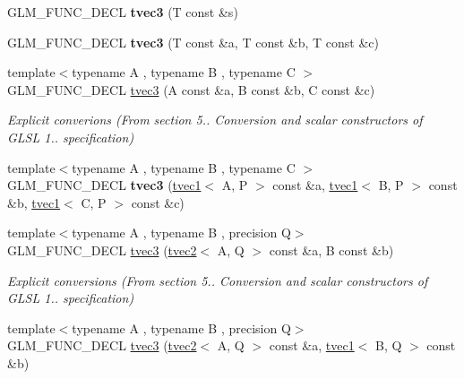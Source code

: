 \begin{DoxyCompactItemize}
\item 
\hypertarget{structglm_1_1tvec3_a60d8f066b56d8355f2ac77a8e6ed1539}{G\-L\-M\-\_\-\-F\-U\-N\-C\-\_\-\-D\-E\-C\-L {\bfseries tvec3} (T const \&s)}\label{structglm_1_1tvec3_a60d8f066b56d8355f2ac77a8e6ed1539}

\item 
\hypertarget{structglm_1_1tvec3_a37152c2d3518d9102b5f39d9d1e72aef}{G\-L\-M\-\_\-\-F\-U\-N\-C\-\_\-\-D\-E\-C\-L {\bfseries tvec3} (T const \&a, T const \&b, T const \&c)}\label{structglm_1_1tvec3_a37152c2d3518d9102b5f39d9d1e72aef}

\item 
\hypertarget{structglm_1_1tvec3_a0b681461de215371b4f8bacbf514bd40}{{\footnotesize template$<$typename A , typename B , typename C $>$ }\\G\-L\-M\-\_\-\-F\-U\-N\-C\-\_\-\-D\-E\-C\-L \hyperlink{structglm_1_1tvec3_a0b681461de215371b4f8bacbf514bd40}{tvec3} (A const \&a, B const \&b, C const \&c)}\label{structglm_1_1tvec3_a0b681461de215371b4f8bacbf514bd40}

\begin{DoxyCompactList}\small\item\em Explicit converions (From section 5.. Conversion and scalar constructors of G\-L\-S\-L 1.. specification) \end{DoxyCompactList}\item 
\hypertarget{structglm_1_1tvec3_aa785ff9b6da14ac85b793f0af36ff852}{{\footnotesize template$<$typename A , typename B , typename C $>$ }\\G\-L\-M\-\_\-\-F\-U\-N\-C\-\_\-\-D\-E\-C\-L {\bfseries tvec3} (\hyperlink{structglm_1_1tvec1}{tvec1}$<$ A, P $>$ const \&a, \hyperlink{structglm_1_1tvec1}{tvec1}$<$ B, P $>$ const \&b, \hyperlink{structglm_1_1tvec1}{tvec1}$<$ C, P $>$ const \&c)}\label{structglm_1_1tvec3_aa785ff9b6da14ac85b793f0af36ff852}

\item 
\hypertarget{structglm_1_1tvec3_ad2542f4353388c57283dd78e932853ba}{{\footnotesize template$<$typename A , typename B , precision Q$>$ }\\G\-L\-M\-\_\-\-F\-U\-N\-C\-\_\-\-D\-E\-C\-L \hyperlink{structglm_1_1tvec3_ad2542f4353388c57283dd78e932853ba}{tvec3} (\hyperlink{structglm_1_1tvec2}{tvec2}$<$ A, Q $>$ const \&a, B const \&b)}\label{structglm_1_1tvec3_ad2542f4353388c57283dd78e932853ba}

\begin{DoxyCompactList}\small\item\em Explicit conversions (From section 5.. Conversion and scalar constructors of G\-L\-S\-L 1.. specification) \end{DoxyCompactList}\item 
\hypertarget{structglm_1_1tvec3_a1cede1ff2a5ced1c90c9b81fafcc9e00}{{\footnotesize template$<$typename A , typename B , precision Q$>$ }\\G\-L\-M\-\_\-\-F\-U\-N\-C\-\_\-\-D\-E\-C\-L \hyperlink{structglm_1_1tvec3_a1cede1ff2a5ced1c90c9b81fafcc9e00}{tvec3} (\hyperlink{structglm_1_1tvec2}{tvec2}$<$ A, Q $>$ const \&a, \hyperlink{structglm_1_1tvec1}{tvec1}$<$ B, Q $>$ const \&b)}\label{structglm_1_1tvec3_a1cede1ff2a5ced1c90c9b81fafcc9e00}


\end{DoxyCompactItemize}
